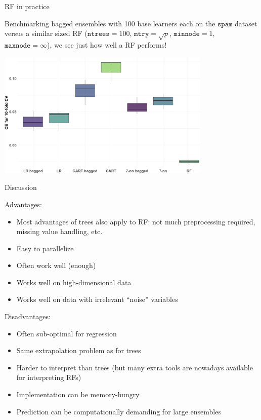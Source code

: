 \documentclass[11pt,compress,t,notes=noshow, xcolor=table]{beamer}
\begin{document}
\begin{vbframe}{RF in practice}

Benchmarking bagged ensembles with 100 base learners each on the $\texttt{spam}$ dataset versus a similar sized RF ($\texttt{ntrees} = 100$, $\texttt{mtry} = \sqrt{p}$, $\texttt{minnode} = 1$, $\texttt{maxnode} = \infty$), we see just how well a RF performs!

\begin{center}
\includegraphics[width=290pt]{figure/bagging-bench_RF.png}
\end{center}

\end{vbframe}

\begin{vbframe}{Discussion}

Advantages:
\begin{itemize}
  \item Most advantages of trees also apply to RF: not much preprocessing required, missing value handling, etc.
  \item Easy to parallelize
  \item Often work well (enough)
  \item Works well on high-dimensional data 
  \item Works well on data with irrelevant \enquote{noise} variables
\end{itemize}

Disadvantages:
\begin{itemize}
  \item Often sub-optimal for regression
  \item Same extrapolation problem as for trees
  \item Harder to interpret than trees (but many extra tools are nowadays
    available for interpreting RFs)
  \item Implementation can be memory-hungry
  \item Prediction can be computationally demanding for large ensembles
\end{itemize}

\end{vbframe}

\endlecture
\end{document}
